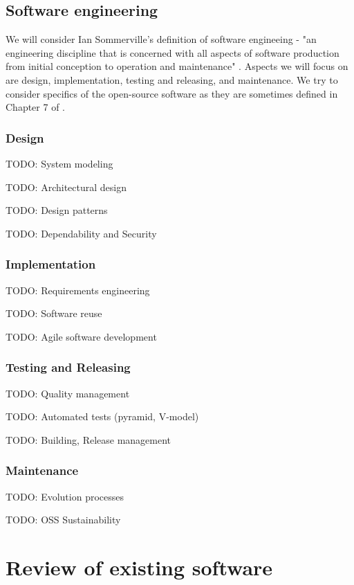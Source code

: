 \documentclass[thesismargins, english, thesislinespacing, onelinechapterstyle, upjsfrontpage]{rnthesis}
\begin{document}
\section{Software engineering}

We will consider Ian Sommerville's definition of software engineeing - "an engineering discipline that is concerned with all aspects of software production from initial conception to operation and maintenance" \cite{sommerville}.
Aspects we will focus on are design, implementation, testing and releasing, and maintenance.
We try to consider specifics of the open-source software as they are sometimes defined in Chapter 7 of \cite{oss}.

\subsection{Design}

TODO: System modeling

TODO: Architectural design

TODO: Design patterns

TODO: Dependability and Security

\subsection{Implementation}

TODO: Requirements engineering

TODO: Software reuse

TODO: Agile software development

\subsection{Testing and Releasing}

TODO: Quality management

TODO: Automated tests (pyramid, V-model)

TODO: Building, Release management

\subsection{Maintenance}

TODO: Evolution processes

TODO: OSS Sustainability
\fi

\chapter{Review of existing software} \label{review}
\end{document}
